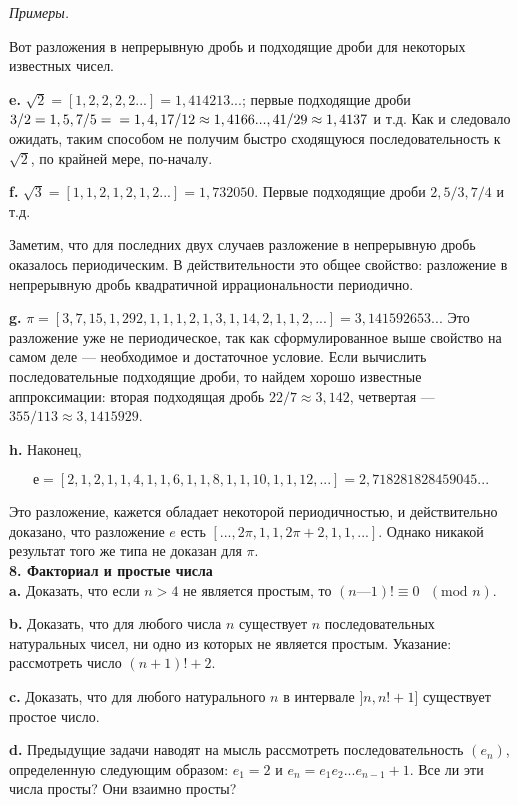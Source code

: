 \noindent \textit{Примеры.}

Вот разложения в непрерывную дробь и подходящие дроби для 
некоторых известных чисел.

\textbf{e.} $\sqrt{2} = [1,2,2,2,2...] = 1,414213...$; первые подходящие дроби $3/2 = 1,5, 7/5 = \\ = 1,4, 17/12 \approx 1,4166..., 41/29 \approx 1,4137$ и т.д. Как и следовало ожидать, таким способом не получим быстро сходящуюся
последовательность к $\sqrt{2}$, по крайней мере, по-началу.

\textbf{f.} $\sqrt{3} = [1,1,2,1,2,1,2...] = 1,732050$. Первые подходящие дроби $2, 5/3, 7/4$ и т.д.

Заметим, что для последних двух случаев разложение в непрерывную дробь оказалось периодическим. В действительности это общее свойство: разложение в непрерывную дробь квадратичной иррациональности периодично.

\textbf{g.} $\pi = [3,7,15,1,292,1,1,1,2,1,3,1,14,2,1,1,2,...] = 3,141592653...$ Это разложение уже не периодическое, так как сформулированное 
выше свойство на самом деле — необходимое и достаточное условие. Если вычислить последовательные подходящие дроби, то найдем хорошо известные аппроксимации: вторая подходящая дробь $22/7 \approx 3,142$, 
четвертая — $355/113 \approx 3,1415929$.

\pagebreak

\textbf{h.} Наконец,

\[
е = [2,1,2,1,1,4,1,1,6,1,1,8,1,1,10,1,1,12,...] = 2,718 281828459045...
\]

\noindent Это разложение, кажется обладает некоторой периодичностью, и 
действительно доказано, что разложение $e$ есть $[...,2\pi,1,1,2\pi+2,1,1,...]$. Однако никакой результат того же типа не доказан для $\pi$.
\\

\noindent \textbf{8. Факториал и простые числа}
\\

\textbf{a.} Доказать, что если $n > 4$ не является простым, то $(n — 1)! \equiv 0 \text{ } (\text{mod } n)$.

\textbf{b.} Доказать, что для любого числа $n$ существует $n$ 
последовательных натуральных чисел, ни одно из которых не является простым. 
Указание: рассмотреть число $(n + 1)! + 2$.

\textbf{c.} Доказать, что для любого натурального $n$ в интервале $]n, n! + 1]$ существует простое число.

\textbf{d.} Предыдущие задачи наводят на мысль рассмотреть 
последовательность $(e_n)$, определенную следующим образом: $e_1 = 2$ и
$e_n = e_1e_2...e_{n-1}+1$. Все ли эти числа просты? Они взаимно просты?
\\

